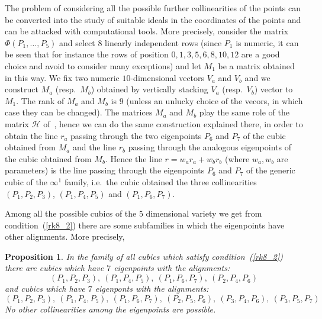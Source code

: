 \documentclass[11pt, a4paper, reqno, captions=tableheading,bibliography=totoc]{scrartcl}
\theoremstyle{plain}
\newtheorem{prop}[lemma]{Proposition}
\theoremstyle{definition}
\begin{document}
The problem of considering all the possible further
collinearities of the points can be converted into the study of suitable
ideals in the coordinates of the points and can be attacked with
computational tools. More precisely,
consider the matrix $\Phi(P_1, \dots, P_5)$ and select $8$ linearly independent
rows (since $P_1$ is numeric, it can be seen that for instance the rows
of position $0, 1, 3, 5, 6, 8, 10, 12$ are a good choice and avoid to consider
many exceptions) and let $M_1$ be a matrix obtained in this way.
We fix two numeric $10$-dimensional vectors $V_a$ and $V_b$ and we construct
$M_a$ (resp.\ $M_b$) obtained by vertically stacking $V_a$ (resp.\ $V_b$)
vector to $M_1$. The rank of $M_a$ and $M_b$ is $9$ (unless an unlucky choice
of the vecors, in which case they can be changed). The matrices $M_a$ and
$M_b$ play the same role of the matrix $\mathcal{H}$
of~, hence we can do the same construction explained
there, in order to obtain the line $r_a$ passing through the two
eigenpoints $P_6$ and $P_7$ of the cubic obtained from $M_a$ and the
line $r_b$ passing through the analogous eigenpoints of the cubic
obtained from $M_b$.
Hence the line $r = w_ar_a+w_br_b$
(where $w_a, w_b$ are parameters) is the line passing through the eigenpoints
$P_6$ and $P_7$
of the generic cubic of the $\infty^1$ family, i.e.\ the cubic obtained
the three collinearities $(P_1, P_2, P_3)$,
$(P_1, P_4, P_5)$ and $(P_1, P_6, P_7)$.



Among all the possible cubics of the $5$ dimensional variety we get from
condition~(\ref{rk8_2}) there are some subfamilies in which the eigenpoints
have other alignments. More precisely,
\begin{prop}
\label{prop:rk8_2B}
In the family of all cubics which satisfy condition~(\ref{rk8_2}) there 
are cubics which have $7$ eigenpoints with the alignments:
\[
(P_1, P_2, P_3),\  (P_1, P_4, P_5),\  (P_1, P_6, P_7),\  (P_2, P_4, P_6)
\]
and cubics which have $7$ eigenponts with the alignments:
\[
(P_1, P_2, P_3),\  (P_1, P_4, P_5), \ (P_1, P_6, P_7),\  (P_2, P_5, P_6),\ 
(P_3, P_4, P_6),\  (P_3, P_5, P_7)
\]
No other collinearities among the eigenpoints are possible.
\end{prop}
\end{document}

